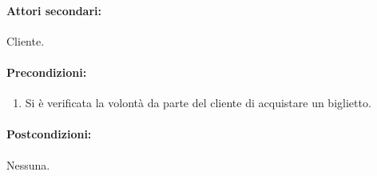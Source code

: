 \documentclass{article}
\begin{document}
	\paragraph{Attori secondari:}Cliente.
	
	\paragraph{Precondizioni:} 
		\begin{enumerate}[itemsep=8pt,parsep=0pt]
			\item Si è verificata la volontà da parte del cliente di acquistare un biglietto.
		\end{enumerate}

	
	\paragraph{Postcondizioni:}Nessuna.
	
\end{document}
